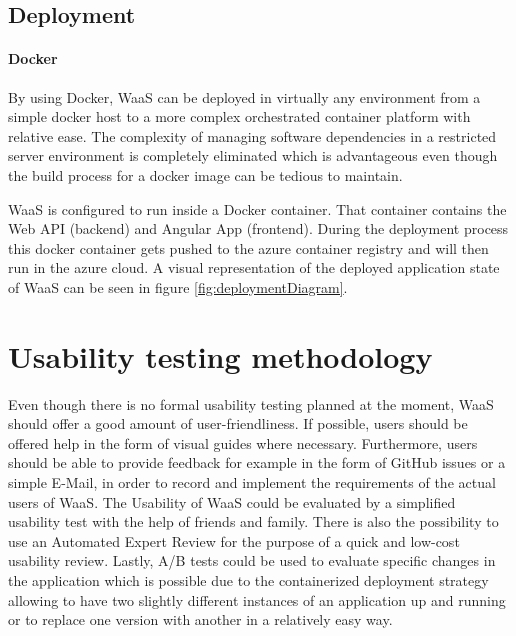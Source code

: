 \documentclass[titlepage, 12pt]{article}
\begin{document}
\subsection{Deployment}

\paragraph{Docker}
By using Docker, WaaS can be deployed in virtually any environment from a simple docker host to a more complex orchestrated container platform with relative ease.
The complexity of managing software dependencies in a restricted server environment is completely eliminated which is advantageous
even though the build process for a docker image can be tedious to maintain.

WaaS is configured to run inside a Docker container. That container contains the Web API (backend) and Angular App (frontend). During the deployment process this docker container gets pushed to the azure container registry and will then run in the azure cloud. A visual representation of the deployed application state of WaaS can be seen in figure \ref{fig:deploymentDiagram}.


\section {Usability testing methodology}
Even though there is no formal usability testing planned at the moment, WaaS should offer a good amount of user-friendliness.
If possible, users should be offered help in the form of visual guides where necessary.
Furthermore, users should be able to provide feedback for example in the form of GitHub issues or a simple E-Mail, in order to record and implement the requirements of the actual users of WaaS.
The Usability of WaaS could be evaluated by a simplified usability test with the help of friends and family.
There is also the possibility to use an Automated Expert Review for the purpose of a quick and low-cost usability review.
Lastly, A/B tests could be used to evaluate specific changes in the application which is possible due to the containerized deployment strategy allowing to have two slightly different
instances of an application up and running or to replace one version with another in a relatively easy way.

\pagebreak

\listoftables
\listoffigures

\pagebreak



\end{document}
